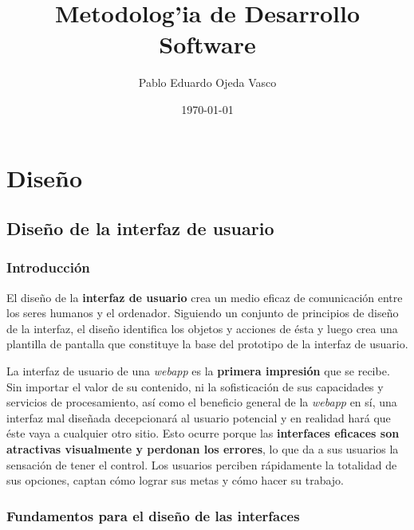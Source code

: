 \documentclass[a4paper,oneside,11pt]{book}
\begin{document}
\title{Metodolog'ia de Desarrollo Software}
\author{Pablo Eduardo Ojeda Vasco}
\date{\today}



	\maketitle
%
%
\chapter{Diseño} %
	\label{sec:diseno}

	\section{Diseño de la interfaz de usuario} %
	\label{sec:interfaz_usuario}
	
	\subsection{Introducción} %
		\label{sub:iu_introduccion}
	
	El diseño de la \textbf{interfaz de usuario} crea un medio eficaz de comunicación entre los seres humanos y el ordenador. Siguiendo un conjunto de principios de diseño de la interfaz, el diseño identifica los objetos y acciones de ésta y luego crea una plantilla de pantalla que constituye la base del prototipo de la interfaz de usuario.
	
	La interfaz de usuario de una \textit{webapp} es la \textbf{primera impresión} que se recibe. Sin importar el valor de su contenido, ni la sofisticación de sus capacidades y servicios de procesamiento, así como el beneficio general de la \textit{webapp} en sí, una interfaz mal diseñada decepcionará al usuario potencial y en realidad hará que éste vaya a cualquier otro sitio. Esto ocurre porque las \textbf{interfaces eficaces son atractivas visualmente y perdonan los errores}, lo que da a sus usuarios la sensación de tener el control. Los usuarios perciben rápidamente la totalidad de sus opciones, captan cómo lograr sus metas y cómo hacer su trabajo.
	
	
	\subsection{Fundamentos para el diseño de las interfaces} %
	\label{sub:iu_fundamentos}
	
\end{document}
